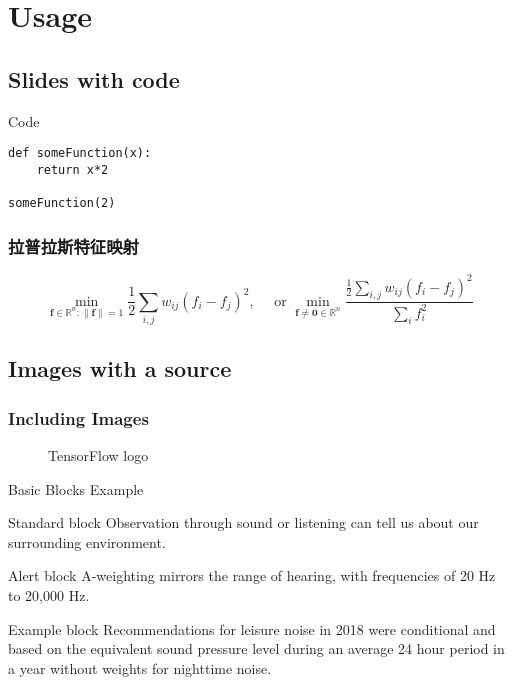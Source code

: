 	\section{Usage}
	\subsection{Slides with code}
	\begin{frame}[fragile=singleslide]{Code}
		\begin{lstlisting}
def someFunction(x):
	return x*2

someFunction(2)
\end{lstlisting}
	\end{frame}

	\begin{frame}
		\frametitle{拉普拉斯特征映射}

		\begin{equation}
			\min _{\mathbf{f} \in \mathbb{R}^n:\|\mathbf{f}\|=1} \frac{1}{2} \sum_{i, j} w_{i j}\left(f_i-f_j\right)^2, \quad \text { or } \min _{\mathbf{f} \neq \mathbf{0} \in \mathbb{R}^n} \frac{\frac{1}{2} \sum_{i, j} w_{i j}\left(f_i-f_j\right)^2}{\sum_i f_i^2}
		\end{equation}

	\end{frame}

	\subsection{Images with a source}
	\begin{frame}
		\frametitle{Including Images}
		\begin{figure}
			\centering
			\caption{TensorFlow logo}
		\end{figure}
	\end{frame}

	\begin{frame}{Basic Blocks Example}
		\begin{block}{Standard block}
			Observation through sound or listening can tell us about our surrounding environment.
		\end{block}
		\begin{alertblock}{Alert block}
			A-weighting mirrors the range of hearing, with frequencies of 20 Hz to 20,000 Hz.
		\end{alertblock}
		\begin{exampleblock}{Example block}
			Recommendations for leisure noise in 2018 were conditional and based on the equivalent sound pressure level during an average 24 hour period in a year without weights for nighttime noise.
		\end{exampleblock}
	\end{frame}
\fi


